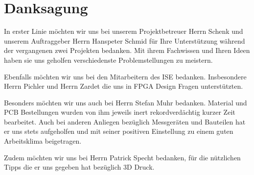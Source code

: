 \clearpage
\section{Danksagung}\label{sec:Danksagung}

In erster Linie möchten wir uns bei unserem Projektbetreuer Herrn Schenk und unserem Auftraggeber Herrn Hanspeter Schmid für Ihre Unterstützung während der vergangenen zwei Projekten bedanken. Mit ihrem Fachwissen und Ihren Ideen haben sie uns geholfen verschiedenste Problemstellungen zu meistern. 

Ebenfalls möchten wir uns bei den Mitarbeitern des ISE bedanken. Insbesondere Herrn Pichler und Herrn Zardet die uns in FPGA Design Fragen unterstützten.

Besonders möchten wir uns auch bei Herrn Stefan Muhr bedanken. Material und PCB Bestellungen wurden von ihm jeweils inert rekordverdächtig kurzer Zeit bearbeitet. Auch bei anderen Anliegen bezüglich Messgeräten und Bauteilen hat er uns stets aufgeholfen und mit seiner positiven Einstellung zu einem guten Arbeitsklima beigetragen.  

Zudem möchten wir uns bei Herrn Patrick Specht bedanken, für die nützlichen Tipps die er uns gegeben hat bezüglich 3D Druck.




